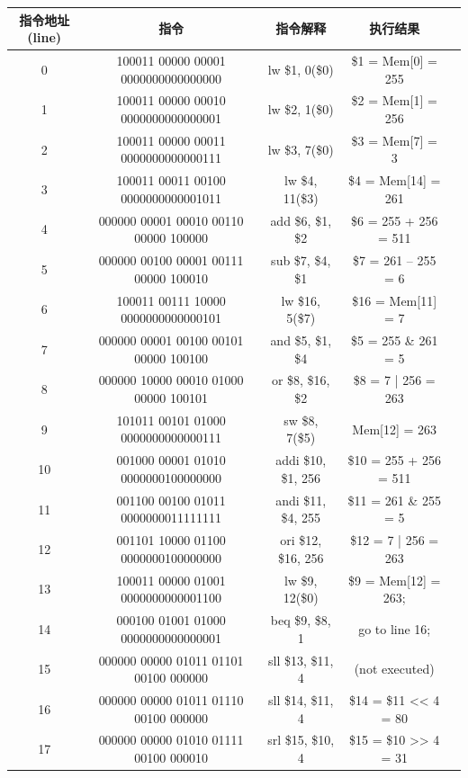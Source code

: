 \documentclass{cumcm}
\numberwithin{equation}{section}
\numberwithin{equation}{subsection}
\begin{document}
\begin{table}[htbp]
    \centering
    \begin{tabular}{|c|c|c|c|c|}
        \hline
        指令地址(line) & 指令 & 指令解释 & 执行结果\\ \hline
        0 & 100011 00000 00001 0000000000000000 & lw \$1, 0(\$0) & \$1 = Mem[0] = 255 \\
        1 & 100011 00000 00010 0000000000000001 & lw \$2, 1(\$0) & \$2 = Mem[1] = 256 \\
        2 & 100011 00000 00011 0000000000000111 & lw \$3, 7(\$0) & \$3 = Mem[7] = 3\\
        3 & 100011 00011 00100 0000000000001011 & lw \$4, 11(\$3) & \$4 = Mem[14] = 261\\
        4 & 000000 00001 00010 00110 00000 100000 & add \$6, \$1, \$2 & \$6 = 255 + 256 = 511\\
        5 & 000000 00100 00001 00111 00000 100010 & sub \$7, \$4, \$1 & \$7 = 261 – 255 = 6\\
        6 & 100011 00111 10000 0000000000000101 & lw \$16, 5(\$7) & \$16 = Mem[11] = 7\\
        7 & 000000 00001 00100 00101 00000 100100 & and \$5, \$1, \$4 & \$5 = 255 \& 261 = 5\\
        8 & 000000 10000 00010 01000 00000 100101 & or \$8, \$16, \$2 & \$8 = 7 | 256 = 263\\
        9 & 101011 00101 01000 0000000000000111 & sw \$8, 7(\$5) & Mem[12] = 263\\
        10 & 001000 00001 01010 0000000100000000 & addi \$10, \$1, 256 & \$10 = 255 + 256 = 511\\
        11 & 001100 00100 01011 0000000011111111 & andi \$11, \$4, 255 & \$11 = 261 \& 255 = 5\\
        12 & 001101 10000 01100 0000000100000000 & ori \$12, \$16, 256 & \$12 = 7 | 256 = 263\\
        13 & 100011 00000 01001 0000000000001100 & lw \$9, 12(\$0) & \$9 = Mem[12] = 263;\\
        14 & 000100 01001 01000 0000000000000001 & beq \$9, \$8, 1 & go to line 16;\\
        15 & 000000 00000 01011 01101 00100 000000 & sll \$13, \$11, 4 & (not executed)\\
        16 & 000000 00000 01011 01110 00100 000000 & sll \$14, \$11, 4 & \$14 = \$11 << 4 = 80\\
        17 & 000000 00000 01010 01111 00100 000010 & srl \$15, \$10, 4 & \$15 = \$10 >> 4 = 31\\

\end{tabular}
\end{table}
\end{document}
